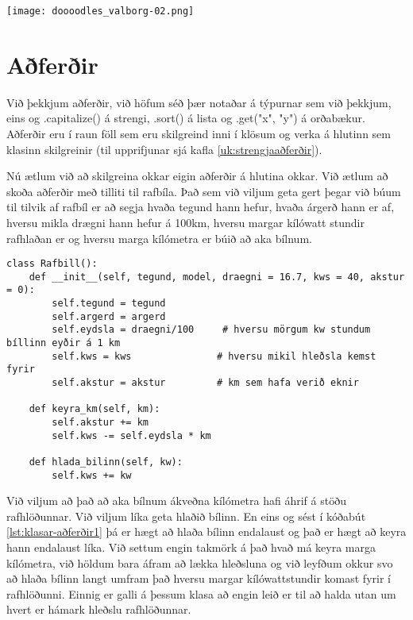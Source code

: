 \phantom{easter egg}
\begin{center}
	\texttt{[image: doooodles\_valborg-02.png]}
\end{center}

\section{Aðferðir}\label{uk:klasar-aðferðir}
Við þekkjum aðferðir, við höfum séð þær notaðar á týpurnar sem við þekkjum, eins og .capitalize() á strengi, .sort() á lista og .get("x", "y") á orðabækur.
Aðferðir eru í raun föll sem eru skilgreind inni í klösum og verka á hlutinn sem klasinn skilgreinir (til upprifjunar sjá kafla \ref{uk:strengjaaðferðir}).

Nú ætlum við að skilgreina okkar eigin aðferðir á hlutina okkar.
Við ætlum að skoða aðferðir með tilliti til rafbíla.
Það sem við viljum geta gert þegar við búum til tilvik af rafbíl er að segja hvaða tegund hann hefur, hvaða árgerð hann er af, hversu mikla drægni hann hefur á 100km, hversu margar kílówatt stundir rafhlaðan er og hversu marga kílómetra er búið að aka bílnum.

\begin{lstlisting}[caption=Klasa aðferðir á rafbílaklasa, label=lst:klasar-aðferðir1]
class Rafbill():
	def __init__(self, tegund, model, draegni = 16.7, kws = 40, akstur = 0):
		self.tegund = tegund     
		self.argerd = argerd        
		self.eydsla = draegni/100     # hversu mörgum kw stundum bíllinn eyðir á 1 km
		self.kws = kws               # hversu mikil hleðsla kemst fyrir
		self.akstur = akstur         # km sem hafa verið eknir

	def keyra_km(self, km):
		self.akstur += km
		self.kws -= self.eydsla * km  

	def hlada_bilinn(self, kw):
		self.kws += kw
\end{lstlisting}

Við viljum að það að aka bílnum ákveðna kílómetra hafi áhrif á stöðu rafhlöðunnar.
Við viljum líka geta hlaðið bílinn.
En eins og sést í kóðabút \ref{lst:klasar-aðferðir1} þá er hægt að hlaða bílinn endalaust og það er hægt að keyra hann endalaust líka.
Við settum engin takmörk á það hvað má keyra marga kílómetra, við höldum bara áfram að lækka hleðsluna og við leyfðum okkur svo að hlaða bílinn langt umfram það hversu margar kílówattstundir komast fyrir í rafhlöðunni.
Einnig er galli á þessum klasa að engin leið er til að halda utan um hvert er hámark hleðslu rafhlöðunnar.

